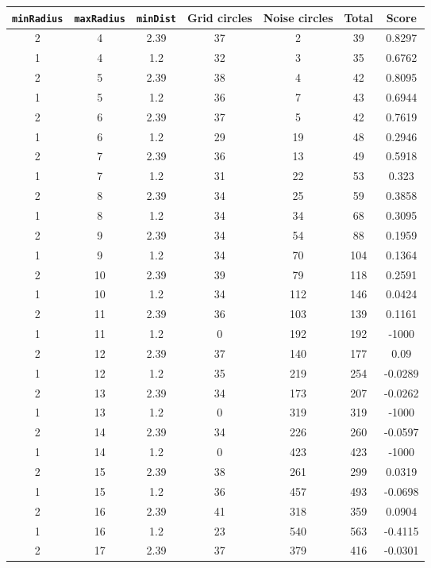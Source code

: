\documentclass[letterpaper, 12pt]{article}
\begin{document}
\begin{longtable}{|c|c|c|c|c|c|c|}
\hline
\textbf{\texttt{minRadius}} & \textbf{\texttt{maxRadius}} & \textbf{\texttt{minDist}} & \textbf{Grid circles} & \textbf{Noise circles} & \textbf{Total} & \textbf{Score} \\
\hline
2 & 4 & 2.39 & 37 & 2 & 39 & 0.8297 \\
\hline
1 & 4 & 1.2 & 32 & 3 & 35 & 0.6762 \\
\hline
2 & 5 & 2.39 & 38 & 4 & 42 & 0.8095 \\
\hline
1 & 5 & 1.2 & 36 & 7 & 43 & 0.6944 \\
\hline
2 & 6 & 2.39 & 37 & 5 & 42 & 0.7619 \\
\hline
1 & 6 & 1.2 & 29 & 19 & 48 & 0.2946 \\
\hline
2 & 7 & 2.39 & 36 & 13 & 49 & 0.5918 \\
\hline
1 & 7 & 1.2 & 31 & 22 & 53 & 0.323 \\
\hline
2 & 8 & 2.39 & 34 & 25 & 59 & 0.3858 \\
\hline
1 & 8 & 1.2 & 34 & 34 & 68 & 0.3095 \\
\hline
2 & 9 & 2.39 & 34 & 54 & 88 & 0.1959 \\
\hline
1 & 9 & 1.2 & 34 & 70 & 104 & 0.1364 \\
\hline
2 & 10 & 2.39 & 39 & 79 & 118 & 0.2591 \\
\hline
1 & 10 & 1.2 & 34 & 112 & 146 & 0.0424 \\
\hline
2 & 11 & 2.39 & 36 & 103 & 139 & 0.1161 \\
\hline
1 & 11 & 1.2 & 0 & 192 & 192 & -1000 \\
\hline
2 & 12 & 2.39 & 37 & 140 & 177 & 0.09 \\
\hline
1 & 12 & 1.2 & 35 & 219 & 254 & -0.0289 \\
\hline
2 & 13 & 2.39 & 34 & 173 & 207 & -0.0262 \\
\hline
1 & 13 & 1.2 & 0 & 319 & 319 & -1000 \\
\hline
2 & 14 & 2.39 & 34 & 226 & 260 & -0.0597 \\
\hline
1 & 14 & 1.2 & 0 & 423 & 423 & -1000 \\
\hline
2 & 15 & 2.39 & 38 & 261 & 299 & 0.0319 \\
\hline
1 & 15 & 1.2 & 36 & 457 & 493 & -0.0698 \\
\hline
2 & 16 & 2.39 & 41 & 318 & 359 & 0.0904 \\
\hline
1 & 16 & 1.2 & 23 & 540 & 563 & -0.4115 \\
\hline
2 & 17 & 2.39 & 37 & 379 & 416 & -0.0301 \\

\end{longtable}
\end{document}
